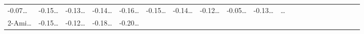 \documentclass[
]{article}
\begin{document}
\begin{longtable}[]{@{}lllllllllllllllllllll@{}}
\begin{minipage}[t]{0.03\columnwidth}
-0.07\ldots{}\strut
\end{minipage} & \begin{minipage}[t]{0.03\columnwidth}\raggedright
-0.15\ldots{}\strut
\end{minipage} & \begin{minipage}[t]{0.03\columnwidth}\raggedright
-0.13\ldots{}\strut
\end{minipage} & \begin{minipage}[t]{0.03\columnwidth}\raggedright
-0.14\ldots{}\strut
\end{minipage} & \begin{minipage}[t]{0.03\columnwidth}\raggedright
-0.16\ldots{}\strut
\end{minipage} & \begin{minipage}[t]{0.03\columnwidth}\raggedright
-0.15\ldots{}\strut
\end{minipage} & \begin{minipage}[t]{0.03\columnwidth}\raggedright
-0.14\ldots{}\strut
\end{minipage} & \begin{minipage}[t]{0.03\columnwidth}\raggedright
-0.12\ldots{}\strut
\end{minipage} & \begin{minipage}[t]{0.03\columnwidth}\raggedright
-0.05\ldots{}\strut
\end{minipage} & \begin{minipage}[t]{0.03\columnwidth}\raggedright
-0.13\ldots{}\strut
\end{minipage} & \begin{minipage}[t]{0.01\columnwidth}\raggedright
\ldots{}\strut
\end{minipage}\tabularnewline
\begin{minipage}[t]{0.03\columnwidth}\raggedright
2-Ami\ldots{}\strut
\end{minipage} & \begin{minipage}[t]{0.03\columnwidth}\raggedright
-0.15\ldots{}\strut
\end{minipage} & \begin{minipage}[t]{0.03\columnwidth}\raggedright
-0.12\ldots{}\strut
\end{minipage} & \begin{minipage}[t]{0.03\columnwidth}\raggedright
-0.18\ldots{}\strut
\end{minipage} & \begin{minipage}[t]{0.03\columnwidth}\raggedright
-0.20\ldots{}\strut
\end{minipage} & \begin{minipage}[t]{0.03\columnwidth}\raggedright

\end{minipage}
\end{longtable}
\end{document}
